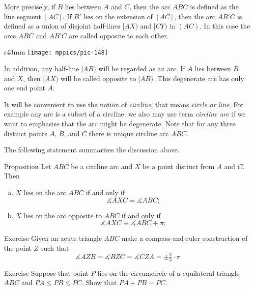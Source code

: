 More precisely,  if $B$ lies between $A$ and $C$, then the \emph{arc} $ABC$ is defined as 
the line segment $[AC]$.
If $B'$ lies on the extension of $[AC]$,
then the arc $AB'C$ is defined as a union of disjoint half-lines $[AX)$ and $[CY)$ in $(AC)$.
In this case the arcs $ABC$ and $AB'C$ are called opposite to each other.

\begin{wrapfigure}{r}{43mm}
\vskip-2mm
\texttt{[image: mppics/pic-148]}
\end{wrapfigure}

In addition, any half-line $[AB)$ will be regarded as an arc.
If $A$ lies between $B$ and $X$, then $[AX)$ will be called opposite to $[AB)$.
This degenerate arc has only one end point $A$.

It will be convenient to use the notion of 
\emph{circline},
that means {}\emph{circle or line}.
For example any arc is a subset of a circline;
we also may use term \emph{circline arc} if we want to emphasise that the arc might be degenerate.
Note that for any three distinct points $A$, $B$, and $C$ there is unique circline arc $ABC$.

The following statement summarizes the discussion above.

\begin{thm}{Proposition}\label{prop:arcs}
Let $ABC$ be a circline arc and $X$ be a point distinct from $A$ and $C$.
Then 
\begin{enumerate}[(a)]
\item $X$ lies on the arc $ABC$ if and only if 
 \[\measuredangle AXC=\measuredangle ABC;\]
\item $X$ lies on the arc opposite to $ABC$ if and only if 
 \[\measuredangle AXC\equiv\measuredangle ABC+\pi;\]
\end{enumerate}
\end{thm}

\begin{thm}{Exercise}\label{ex:3x120}
Given an acute triangle $ABC$
make a compass-and-ruler construction of the point $Z$ such that
\[\measuredangle AZB
= \measuredangle BZC
= \measuredangle CZA
=\pm\tfrac23\cdot\pi\]

\end{thm}

\begin{thm}{Exercise}\label{ex:a+b=c}
Suppose that point $P$ lies on the circumcircle of a equilateral triangle $ABC$
and $PA\le PB\le PC$.
Show that $PA+PB=PC$.
\end{thm}

